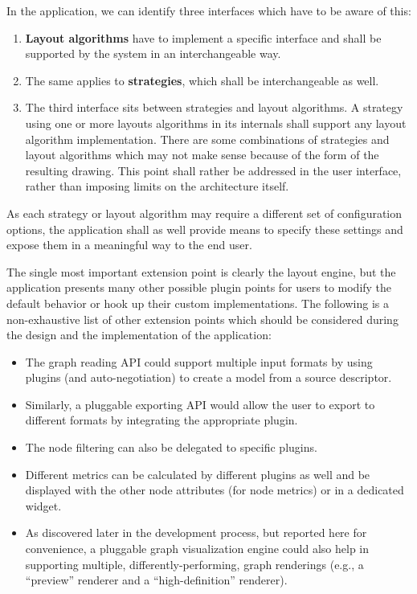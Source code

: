 In the application, we can identify three interfaces which have to be aware of this:
\begin{enumerate}
  \item \textbf{Layout algorithms} have to implement a specific interface and shall be supported by the system in an interchangeable way.
  \item The same applies to \textbf{strategies}, which shall be interchangeable as well.
  \item The third interface sits between strategies and layout algorithms. A strategy using one or more layouts algorithms in its internals shall support any layout algorithm implementation. There are some combinations of strategies and layout algorithms which may not make sense because of the form of the resulting drawing. This point shall rather be addressed in the user interface, rather than imposing limits on the architecture itself.
\end{enumerate}

As each strategy or layout algorithm may require a different set of configuration options, the application shall as well provide means to specify these settings and expose them in a meaningful way to the end user.

The single most important extension point is clearly the layout engine, but the application presents many other possible plugin points for users to modify the default behavior or hook up their custom implementations. The following is a non-exhaustive list of other extension points which should be considered during the design and the implementation of the application:

\begin{itemize}
  \item The graph reading API could support multiple input formats by using plugins (and auto-negotiation) to create a model from a source descriptor.
  \item Similarly, a pluggable exporting API would allow the user to export to different formats by integrating the appropriate plugin.
  \item The node filtering can also be delegated to specific plugins.
  \item Different metrics can be calculated by different plugins as well and be displayed with the other node attributes (for node metrics) or in a dedicated widget.
  \item As discovered later in the development process, but reported here for convenience, a pluggable graph visualization engine could also help in supporting multiple, differently-performing, graph renderings (e.g., a ``preview'' renderer and a ``high-definition'' renderer).
\end{itemize}

